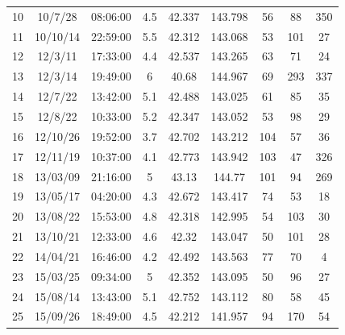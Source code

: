 {\begin{table}[!ht]
{\begin{tabular}{@{}ccccccccc@{}}
      10 & 10/7/28         & 08:06:00        & 4.5   & 42.337       & 143.798       & 56         & 88            & 350         \\
      11 & 10/10/14        & 22:59:00        & 5.5   & 42.312       & 143.068       & 53         & 101           & 27          \\
      12 & 12/3/11         & 17:33:00        & 4.4   & 42.537       & 143.265       & 63         & 71            & 24          \\
      13 & 12/3/14         & 19:49:00        & 6     & 40.68        & 144.967       & 69         & 293           & 337         \\
      14 & 12/7/22         & 13:42:00        & 5.1   & 42.488       & 143.025       & 61         & 85            & 35          \\
      15 & 12/8/22         & 10:33:00        & 5.2   & 42.347       & 143.052       & 53         & 98            & 29          \\
      16 & 12/10/26        & 19:52:00        & 3.7   & 42.702       & 143.212       & 104        & 57            & 36          \\
      17 & 12/11/19        & 10:37:00        & 4.1   & 42.773       & 143.942       & 103        & 47            & 326         \\
      18 & 13/03/09        & 21:16:00        & 5     & 43.13        & 144.77        & 101        & 94            & 269         \\
      19 & 13/05/17        & 04:20:00        & 4.3   & 42.672       & 143.417       & 74         & 53            & 18          \\
      20 & 13/08/22        & 15:53:00        & 4.8   & 42.318       & 142.995       & 54         & 103           & 30          \\
      21 & 13/10/21        & 12:33:00        & 4.6   & 42.32        & 143.047       & 50         & 101           & 28          \\
      22 & 14/04/21        & 16:46:00        & 4.2   & 42.492       & 143.563       & 77         & 70            & 4           \\
      23 & 15/03/25        & 09:34:00        & 5     & 42.352       & 143.095       & 50         & 96            & 27          \\
      24 & 15/08/14        & 13:43:00        & 5.1   & 42.752       & 143.112       & 80         & 58            & 45          \\
      25 & 15/09/26        & 18:49:00        & 4.5   & 42.212       & 141.957       & 94         & 170           & 54          \\

\end{tabular}}
\end{table}}
